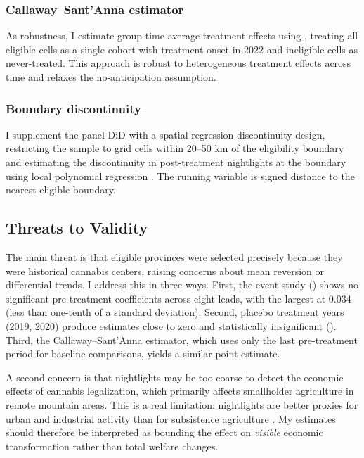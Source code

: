 \documentclass[12pt]{article}
\begin{document}
\subsubsection*{Callaway--Sant'Anna estimator} As robustness, I estimate group-time average treatment effects using \citet{CallawayS2021}, treating all eligible cells as a single cohort with treatment onset in 2022 and ineligible cells as never-treated. This approach is robust to heterogeneous treatment effects across time and relaxes the no-anticipation assumption.

\subsubsection*{Boundary discontinuity} I supplement the panel DiD with a spatial regression discontinuity design, restricting the sample to grid cells within 20--50 km of the eligibility boundary and estimating the discontinuity in post-treatment nightlights at the boundary using local polynomial regression \citep{Calonico2014}. The running variable is signed distance to the nearest eligible boundary.

\subsection{Threats to Validity}

The main threat is that eligible provinces were selected precisely because they were historical cannabis centers, raising concerns about mean reversion or differential trends. I address this in three ways. First, the event study () shows no significant pre-treatment coefficients across eight leads, with the largest at 0.034 (less than one-tenth of a standard deviation). Second, placebo treatment years (2019, 2020) produce estimates close to zero and statistically insignificant (). Third, the Callaway--Sant'Anna estimator, which uses only the last pre-treatment period for baseline comparisons, yields a similar point estimate.

A second concern is that nightlights may be too coarse to detect the economic effects of cannabis legalization, which primarily affects smallholder agriculture in remote mountain areas. This is a real limitation: nightlights are better proxies for urban and industrial activity than for subsistence agriculture \citep{Gibson2021}. My estimates should therefore be interpreted as bounding the effect on \textit{visible} economic transformation rather than total welfare changes.
\end{document}
